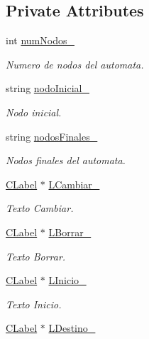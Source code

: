 \subsection*{Private Attributes}
\begin{DoxyCompactItemize}
\item 
int \hyperlink{classCAsistenteCodificacion_a3c77dcdb74837345c1da4a6a7051ee4e}{num\+Nodos\+\_\+}
\begin{DoxyCompactList}\small\item\em Numero de nodos del automata. \end{DoxyCompactList}\item 
string \hyperlink{classCAsistenteCodificacion_ad0d97f8664aa927a414b7fe17b6106d4}{nodo\+Inicial\+\_\+}
\begin{DoxyCompactList}\small\item\em Nodo inicial. \end{DoxyCompactList}\item 
string \hyperlink{classCAsistenteCodificacion_afa94c6d482da4f5eb193ddd7211db25f}{nodos\+Finales\+\_\+}
\begin{DoxyCompactList}\small\item\em Nodos finales del automata. \end{DoxyCompactList}\item 
\hyperlink{classCLabel}{C\+Label} $\ast$ \hyperlink{classCAsistenteCodificacion_af6fcb3e27669afa7b4cc3a3916e90ea3}{L\+Cambiar\+\_\+}
\begin{DoxyCompactList}\small\item\em Texto Cambiar. \end{DoxyCompactList}\item 
\hyperlink{classCLabel}{C\+Label} $\ast$ \hyperlink{classCAsistenteCodificacion_a2820e2c5c034ae5641b3c0a927921be9}{L\+Borrar\+\_\+}
\begin{DoxyCompactList}\small\item\em Texto Borrar. \end{DoxyCompactList}\item 
\hyperlink{classCLabel}{C\+Label} $\ast$ \hyperlink{classCAsistenteCodificacion_a552db8480f43d39488afc2a3485fb8bd}{L\+Inicio\+\_\+}
\begin{DoxyCompactList}\small\item\em Texto Inicio. \end{DoxyCompactList}\item 
\hyperlink{classCLabel}{C\+Label} $\ast$ \hyperlink{classCAsistenteCodificacion_a666efef7460347c564d7a73322ed435c}{L\+Destino\+\_\+}

\end{DoxyCompactItemize}
